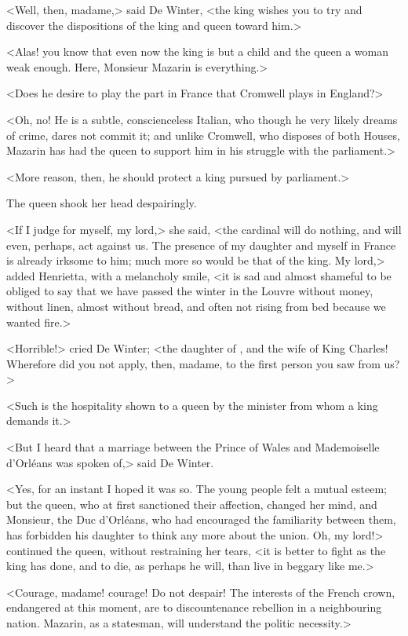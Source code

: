 <Well, then, madame,> said De Winter, <the king wishes you to try and discover the dispositions of the king and queen toward him.>

<Alas! you know that even now the king is but a child and the queen a woman weak enough. Here, Monsieur Mazarin is everything.>

<Does he desire to play the part in France that Cromwell plays in England?>

<Oh, no! He is a subtle, conscienceless Italian, who though he very likely dreams of crime, dares not commit it; and unlike Cromwell, who disposes of both Houses, Mazarin has had the queen to support him in his struggle with the parliament.>

<More reason, then, he should protect a king pursued by parliament.>

The queen shook her head despairingly.

<If I judge for myself, my lord,> she said, <the cardinal will do nothing, and will even, perhaps, act against us. The presence of my daughter and myself in France is already irksome to him; much more so would be that of the king. My lord,> added Henrietta, with a melancholy smile, <it is sad and almost shameful to be obliged to say that we have passed the winter in the Louvre without money, without linen, almost without bread, and often not rising from bed because we wanted fire.>

<Horrible!> cried De Winter; <the daughter of , and the wife of King Charles! Wherefore did you not apply, then, madame, to the first person you saw from us?>

<Such is the hospitality shown to a queen by the minister from whom a king demands it.>

<But I heard that a marriage between the Prince of Wales and Mademoiselle d'Orléans was spoken of,> said De Winter.

<Yes, for an instant I hoped it was so. The young people felt a mutual esteem; but the queen, who at first sanctioned their affection, changed her mind, and Monsieur, the Duc d'Orléans, who had encouraged the familiarity between them, has forbidden his daughter to think any more about the union. Oh, my lord!> continued the queen, without restraining her tears, <it is better to fight as the king has done, and to die, as perhaps he will, than live in beggary like me.>

<Courage, madame! courage! Do not despair! The interests of the French crown, endangered at this moment, are to discountenance rebellion in a neighbouring nation. Mazarin, as a statesman, will understand the politic necessity.>

